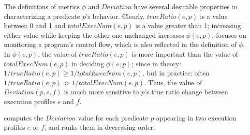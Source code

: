 The definitions of metrics $\phi$ and $Deviation$ have several desirable properties
in characterizing a predicate $p$'s behavior. Clearly, $trueRatio(e,p)$
is a value between 0 and 1 and $totalExecNum(e, p)$ is a value greater than 1; increasing
either value while keeping the other one unchanged increases $\phi(e, p)$.
\ourtool focuses on monitoring a program's control flow, which is also
reflected in the definition of $\phi$. In $\phi(e, p)$,
the value of $trueRatio(e, p)$ is more important than the value
of $totalExecNum(e, p)$
in deciding $\phi(e, p)$; since in theory: $1/trueRatio(e, p) \geq 1/totalExecNum(e, p)$, but
in practice: often $1/trueRatio(e, p) \gg 1/totalExecNum(e, p)$.
Thus, the value of $Deviation(p, e, f)$ is much more sensitive to $p$'s
true ratio change between execution profiles $e$ and $f$. 




\ourtool computes the $Deviation$ value for each predicate $p$
appearing in two execution profiles $e$ or $f$, and
ranks them in decreasing order. 







